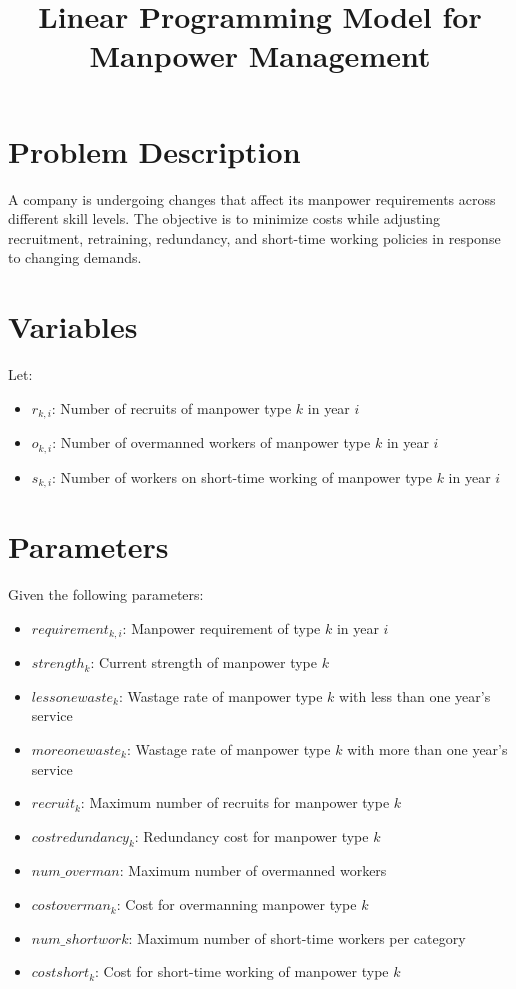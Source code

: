 \documentclass{article}
\begin{document}
\title{Linear Programming Model for Manpower Management}
\author{}
\date{}
\maketitle

\section*{Problem Description}

A company is undergoing changes that affect its manpower requirements across different skill levels. The objective is to minimize costs while adjusting recruitment, retraining, redundancy, and short-time working policies in response to changing demands.

\section*{Variables}

Let:
\begin{itemize}
    \item \( r_{k,i} \): Number of recruits of manpower type \( k \) in year \( i \)
    \item \( o_{k,i} \): Number of overmanned workers of manpower type \( k \) in year \( i \)
    \item \( s_{k,i} \): Number of workers on short-time working of manpower type \( k \) in year \( i \)
\end{itemize}

\section*{Parameters}

Given the following parameters:
\begin{itemize}
    \item \( requirement_{k,i} \): Manpower requirement of type \( k \) in year \( i \)
    \item \( strength_{k} \): Current strength of manpower type \( k \)
    \item \( lessonewaste_{k} \): Wastage rate of manpower type \( k \) with less than one year's service
    \item \( moreonewaste_{k} \): Wastage rate of manpower type \( k \) with more than one year's service
    \item \( recruit_{k} \): Maximum number of recruits for manpower type \( k \)
    \item \( costredundancy_{k} \): Redundancy cost for manpower type \( k \)
    \item \( num\_overman \): Maximum number of overmanned workers
    \item \( costoverman_{k} \): Cost for overmanning manpower type \( k \)
    \item \( num\_shortwork \): Maximum number of short-time workers per category
    \item \( costshort_{k} \): Cost for short-time working of manpower type \( k \)
\end{itemize}
\end{document}

